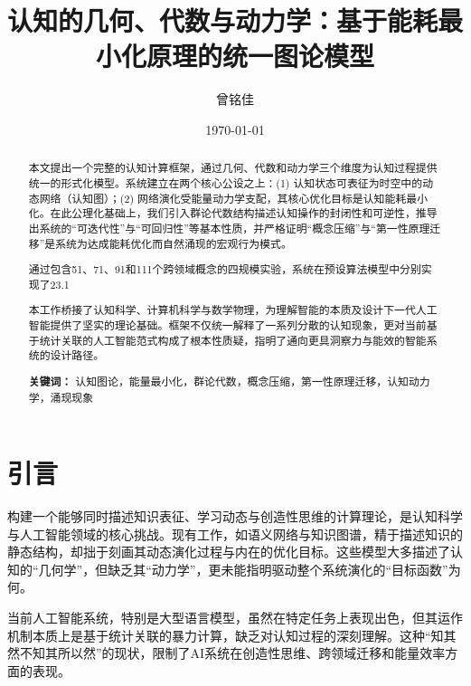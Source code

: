 \documentclass[12pt,a4paper]{article}
\title{认知的几何、代数与动力学：基于能耗最小化原理的统一图论模型}
\author{曾铭佳}
\date{\today}
\begin{document}
\maketitle

\begin{abstract}
本文提出一个完整的认知计算框架，通过几何、代数和动力学三个维度为认知过程提供统一的形式化模型。系统建立在两个核心公设之上：(1) 认知状态可表征为时空中的动态网络（认知图）；(2) 网络演化受能量动力学支配，其核心优化目标是认知能耗最小化。在此公理化基础上，我们引入群论代数结构描述认知操作的封闭性和可逆性，推导出系统的“可迭代性”与“可回归性”等基本性质，并严格证明“概念压缩”与“第一性原理迁移”是系统为达成能耗优化而自然涌现的宏观行为模式。

通过包含51、71、91和111个跨领域概念的四规模实验，系统在预设算法模型中分别实现了23.1%

本工作桥接了认知科学、计算机科学与数学物理，为理解智能的本质及设计下一代人工智能提供了坚实的理论基础。框架不仅统一解释了一系列分散的认知现象，更对当前基于统计关联的人工智能范式构成了根本性质疑，指明了通向更具洞察力与能效的智能系统的设计路径。

\textbf{关键词：} 认知图论，能量最小化，群论代数，概念压缩，第一性原理迁移，认知动力学，涌现现象

\end{abstract}

\section{引言}

构建一个能够同时描述知识表征、学习动态与创造性思维的计算理论，是认知科学与人工智能领域的核心挑战。现有工作，如语义网络与知识图谱，精于描述知识的静态结构，却拙于刻画其动态演化过程与内在的优化目标。这些模型大多描述了认知的“几何学”，但缺乏其“动力学”，更未能指明驱动整个系统演化的“目标函数”为何。

当前人工智能系统，特别是大型语言模型，虽然在特定任务上表现出色，但其运作机制本质上是基于统计关联的暴力计算，缺乏对认知过程的深刻理解。这种“知其然不知其所以然”的现状，限制了AI系统在创造性思维、跨领域迁移和能量效率方面的表现。
\end{document}
